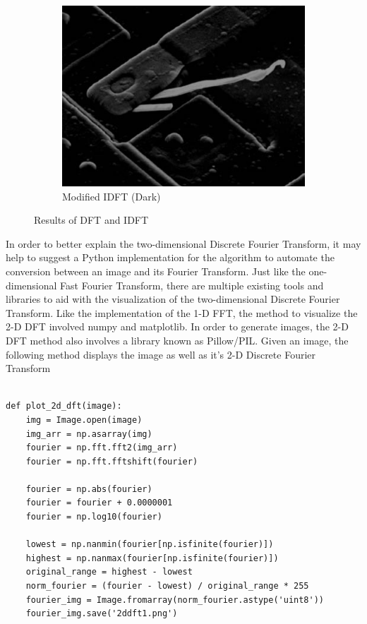\documentclass{amsproc}
\begin{document}
\begin{figure}[h]
\begin{subfigure}{.3\textwidth}
	\includegraphics[scale=.25]{images/dftimage3.png}
	\caption{Modified IDFT (Dark)}
	\label{fig:sub10}
\end{subfigure}
\caption{Results of DFT and IDFT}
\label{fig:im2}
\end{figure}

In order to better explain the two-dimensional Discrete Fourier Transform, it may help to suggest a Python implementation for the algorithm to automate the conversion between an image and its Fourier Transform. Just like the one-dimensional Fast Fourier Transform, there are multiple existing tools and libraries to aid with the visualization of the two-dimensional Discrete Fourier Transform. Like the implementation of the 1-D FFT, the method to visualize the 2-D DFT involved numpy and matplotlib. In order to generate images, the 2-D DFT method also involves a library known as Pillow/PIL. Given an image, the following method displays the image as well as it's 2-D Discrete Fourier Transform \cite{PythonTutorials}

\begin{Verbatim}[tabsize=4]

def plot_2d_dft(image):
	img = Image.open(image)
	img_arr = np.asarray(img)
	fourier = np.fft.fft2(img_arr)
	fourier = np.fft.fftshift(fourier)
	
	fourier = np.abs(fourier)
	fourier = fourier + 0.0000001
	fourier = np.log10(fourier)
	
	lowest = np.nanmin(fourier[np.isfinite(fourier)])
	highest = np.nanmax(fourier[np.isfinite(fourier)])
	original_range = highest - lowest
	norm_fourier = (fourier - lowest) / original_range * 255
	fourier_img = Image.fromarray(norm_fourier.astype('uint8'))
	fourier_img.save('2ddft1.png')
	
\end{Verbatim}
\end{document}
